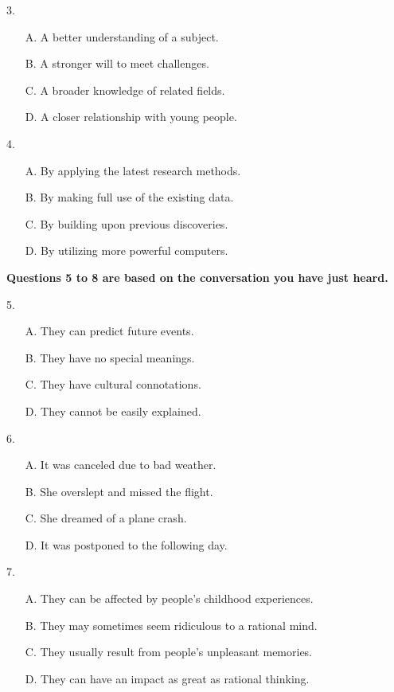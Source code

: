\documentclass[UTF8,11pt]{ctexart}
\begin{document}
3.


\begin{itemize}[leftmargin=2em,itemsep=.2em,topsep=.4em]\item[A.] A better understanding of a subject.
\item[B.] A stronger will to meet challenges.
\item[C.] A broader knowledge of related fields.
\item[D.] A closer relationship with young people.
\end{itemize}

4.


\begin{itemize}[leftmargin=2em,itemsep=.2em,topsep=.4em]\item[A.] By applying the latest research methods.
\item[B.] By making full use of the existing data.
\item[C.] By building upon previous discoveries.
\item[D.] By utilizing more powerful computers.
\end{itemize}

\textbf{Questions 5 to 8 are based on the conversation you have just heard.}


5.


\begin{itemize}[leftmargin=2em,itemsep=.2em,topsep=.4em]\item[A.] They can predict future events.
\item[B.] They have no special meanings.
\item[C.] They have cultural connotations.
\item[D.] They cannot be easily explained.
\end{itemize}

6.


\begin{itemize}[leftmargin=2em,itemsep=.2em,topsep=.4em]\item[A.] It was canceled due to bad weather.
\item[B.] She overslept and missed the flight.
\item[C.] She dreamed of a plane crash.
\item[D.] It was postponed to the following day.
\end{itemize}

7.


\begin{itemize}[leftmargin=2em,itemsep=.2em,topsep=.4em]\item[A.] They can be affected by people's childhood experiences.
\item[B.] They may sometimes seem ridiculous to a rational mind.
\item[C.] They usually result from people's unpleasant memories.
\item[D.] They can have an impact as great as rational thinking.
\end{itemize}
\end{document}
